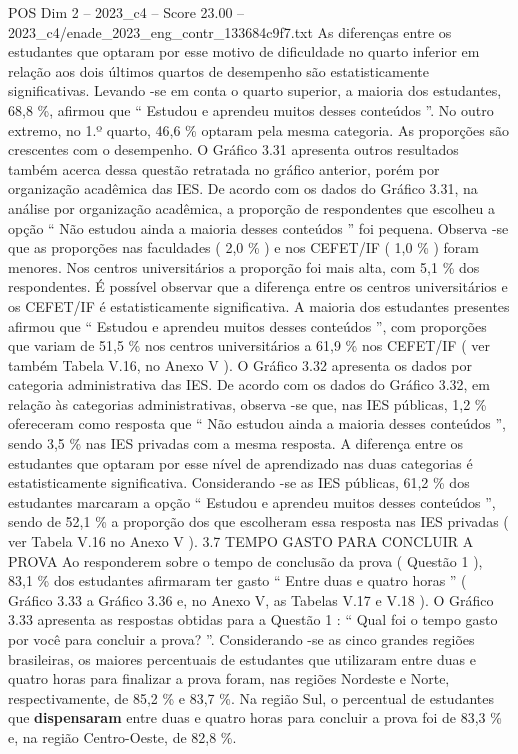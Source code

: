 \begin{textsample}{POS Dim 2 – 2023\_c4 – Score 23.00 – 2023\_c4/enade\_2023\_eng\_contr\_133684c9f7.txt}
As diferenças entre os estudantes que optaram por esse motivo de dificuldade no quarto inferior em relação aos dois últimos quartos de desempenho são estatisticamente significativas.
Levando -se em conta o quarto superior, a maioria dos estudantes, 68,8 \%, afirmou que “ Estudou e aprendeu muitos desses conteúdos ”.
No outro extremo, no 1.º quarto, 46,6 \% optaram pela mesma categoria.
As proporções são crescentes com o desempenho.
O Gráfico 3.31 apresenta outros resultados também acerca dessa questão retratada no gráfico anterior, porém por organização acadêmica das IES.
De acordo com os dados do Gráfico 3.31, na análise por organização acadêmica, a proporção de respondentes que escolheu a opção “ Não estudou ainda a maioria desses conteúdos ” foi pequena.
Observa -se que as proporções nas faculdades ( 2,0 \% ) e nos CEFET/IF ( 1,0 \% ) foram menores.
Nos centros universitários a proporção foi mais alta, com 5,1 \% dos respondentes.
É possível observar que a diferença entre os centros universitários e os CEFET/IF é estatisticamente significativa.
A maioria dos estudantes presentes afirmou que “ Estudou e aprendeu muitos desses conteúdos ”, com proporções que variam de 51,5 \% nos centros universitários a 61,9 \% nos CEFET/IF ( ver também Tabela V.16, no Anexo V ).
O Gráfico 3.32 apresenta os dados por categoria administrativa das IES.
De acordo com os dados do Gráfico 3.32, em relação às categorias administrativas, observa -se que, nas IES públicas, 1,2 \% ofereceram como resposta que “ Não estudou ainda a maioria desses conteúdos ”, sendo 3,5 \% nas IES privadas com a mesma resposta.
A diferença entre os estudantes que optaram por esse nível de aprendizado nas duas categorias é estatisticamente significativa.
Considerando -se as IES públicas, 61,2 \% dos estudantes marcaram a opção “ Estudou e aprendeu muitos desses conteúdos ”, sendo de 52,1 \% a proporção dos que escolheram essa resposta nas IES privadas ( ver Tabela V.16 no Anexo V ). 3.7 TEMPO GASTO PARA CONCLUIR A PROVA Ao responderem sobre o tempo de conclusão da prova ( Questão 1 ), 83,1 \% dos estudantes afirmaram ter gasto “ Entre duas e quatro horas ” ( Gráfico 3.33 a Gráfico 3.36 e, no Anexo V, as Tabelas V.17 e V.18 ).
O Gráfico 3.33 apresenta as respostas obtidas para a Questão 1 : “ Qual foi o tempo gasto por você para concluir a prova? ”.
Considerando -se as cinco grandes regiões brasileiras, os maiores percentuais de estudantes que utilizaram entre duas e quatro horas para finalizar a prova foram, nas regiões Nordeste e Norte, respectivamente, de 85,2 \% e 83,7 \%.
Na região Sul, o percentual de estudantes que \textbf{dispensaram} entre duas e quatro horas para concluir a prova foi de 83,3 \% e, na região Centro-Oeste, de 82,8 \%.

\end{textsample}
